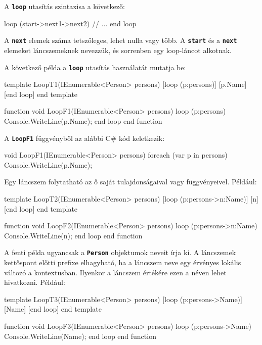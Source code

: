 \documentclass[12pt, a4paper]{report}
\newcommand{\ff}[1]{\textbf{\texttt{#1}}}
\begin{document}
A \ff{loop} utasítás szintaxisa a következő:

\begin{mgencode}
loop (start->next1->next2)
// ...
end loop
\end{mgencode}

A \ff{next} elemek száma tetszőleges, lehet nulla vagy több. A \ff{start} és a \ff{next} elemeket láncszemeknek nevezzük, és sorrenben egy loop-láncot alkotnak.

A következő példa a \ff{loop} utasítás használatát mutatja be:

\begin{mgencode}
template LoopT1(IEnumerable<Person> persons)
  [loop (p:persons)]
[p.Name]
  [end loop]
end template

function void LoopF1(IEnumerable<Person> persons)
  loop (p:persons)
    Console.WriteLine(p.Name);
  end loop
end function
\end{mgencode}

A \ff{LoopF1} függvényből az alábbi C\# kód keletkezik:

\begin{csharpcode}
void LoopF1(IEnumerable<Person> persons)
{
	foreach (var p in persons)
	{
		Console.WriteLine(p.Name);
	}
}
\end{csharpcode}

Egy láncszem folytatható az ő saját tulajdonságaival vagy függvényeivel. Például:

\begin{mgencode}
template LoopT2(IEnumerable<Person> persons)
  [loop (p:persons->n:Name)]
[n]
  [end loop]
end template

function void LoopF2(IEnumerable<Person> persons)
  loop (p:persons->n:Name)
    Console.WriteLine(n);
  end loop
end function
\end{mgencode}

A fenti példa ugyancsak a \ff{Person} objektumok neveit írja ki. A láncszemek kettőspont előtti prefixe elhagyható, ha a láncszem neve egy érvényes lokális változó a kontextusban. Ilyenkor a láncszem értékére ezen a néven lehet hivatkozni. Például:

\begin{mgencode}
template LoopT3(IEnumerable<Person> persons)
  [loop (p:persons->Name)]
[Name]
  [end loop]
end template

function void LoopF3(IEnumerable<Person> persons)
  loop (p:persons->Name)
    Console.WriteLine(Name);
  end loop
end function
\end{mgencode}
\end{document}

